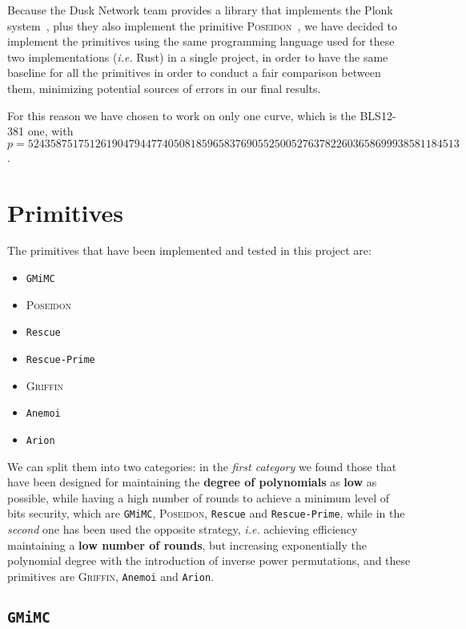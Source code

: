 \documentclass[12pt, a4paper]{report}
\begin{document}
Because the Dusk Network team provides a library that implements the \textsf{Plonk} system~\cite{dusk-plonk}, plus they also implement the primitive \textsc{Poseidon}~\cite{dusk-poseidon}, we have decided to implement the primitives using the same programming language used for these two implementations (\textsl{i.e.} Rust) in a single project, in order to have the same baseline for all the primitives in order to conduct a fair comparison between them, minimizing potential sources of errors in our final results.

For this reason we have chosen to work on only one curve, which is the BLS12-381 one, with $p = 52435875175126190479447740508185965837690552500527637822603658699938581184513$.

\section{Primitives}\label{sec:primitives}

The primitives that have been implemented and tested in this project are:
\begin{itemize}
  \item \texttt{GMiMC}~\cite{gmimc}
  \item \textsc{Poseidon}~\cite{poseidon}
  \item \texttt{Rescue}~\cite{rescue}
  \item \texttt{Rescue-Prime}~\cite{rescue-prime}
  \item \textsc{Griffin}~\cite{griffin}
  \item \texttt{Anemoi}~\cite{anemoi}
  \item \texttt{Arion}~\cite{arion}
\end{itemize}

We can split them into two categories: in the \textit{first category} we found those that have been designed for maintaining the \textbf{degree of polynomials} as \textbf{low} as possible, while having a high number of rounds to achieve a minimum level of bits security, which are \texttt{GMiMC}, \textsc{Poseidon}, \texttt{Rescue} and \texttt{Rescue-Prime}, while in the \textit{second} one has been used the opposite strategy, \textsl{i.e.} achieving efficiency maintaining a \textbf{low number of rounds}, but increasing exponentially the polynomial degree with the introduction of inverse power permutations, and these primitives are \textsc{Griffin}, \texttt{Anemoi} and \texttt{Arion}.

\subsection{\texttt{GMiMC}}\label{subsec:gmimc}
\end{document}
